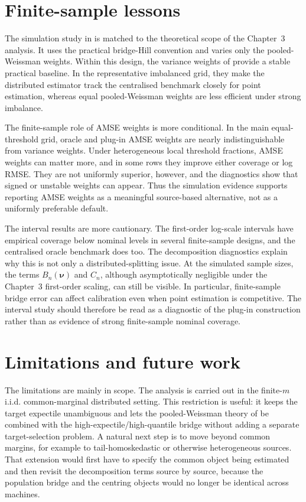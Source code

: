 \section{Finite-sample lessons}
\label{sec:conclusion:finite-sample}

The simulation study in  is matched to the theoretical
scope of the Chapter~3 analysis. It uses the practical bridge-Hill convention and varies
only the pooled-Weissman weights. Within this design, the variance weights of
\textcite{DaouiaPadoanStupfler2021} provide a stable practical baseline. In
the representative imbalanced grid, they make the distributed estimator track
the centralised benchmark closely for point estimation, whereas equal
pooled-Weissman weights are less efficient under strong imbalance.

The finite-sample role of AMSE weights is more conditional. In the main
equal-threshold grid, oracle and plug-in AMSE weights are nearly
indistinguishable from variance weights. Under heterogeneous local threshold
fractions, AMSE weights can matter more, and in some rows they improve either
coverage or log RMSE. They are not uniformly superior, however, and the
diagnostics show that signed or unstable weights can appear. Thus the
simulation evidence supports reporting AMSE weights as a meaningful
source-based alternative, not as a uniformly preferable default.

The interval results are more cautionary. The first-order log-scale intervals
have empirical coverage below nominal levels in several finite-sample designs,
and the centralised oracle benchmark does too. The decomposition diagnostics
explain why this is not only a distributed-splitting issue. At the simulated
sample sizes, the
terms \(B_n(\bm\nu)\) and \(C_n\), although asymptotically negligible under
the Chapter~3 first-order scaling, can still be visible. In particular,
finite-sample bridge error can affect calibration even when point estimation is
competitive.
The interval study should therefore be read as a diagnostic of the plug-in
construction rather than as evidence of strong finite-sample nominal coverage.

\section{Limitations and future work}
\label{sec:conclusion:future}

The limitations are mainly in scope. The analysis
is carried out in the finite-\(m\) i.i.d. common-marginal distributed setting.
This restriction is useful: it keeps the target expectile unambiguous and lets
the pooled-Weissman theory of \textcite{DaouiaPadoanStupfler2021} be combined
with the high-expectile/high-quantile bridge without adding a separate
target-selection problem. A natural next step is to move beyond common
margins, for example to tail-homoskedastic or otherwise heterogeneous sources.
That extension would first have to specify the common object being estimated
and then revisit the decomposition terms source by source, because the
population bridge and the centring objects would no longer be identical across
machines.

